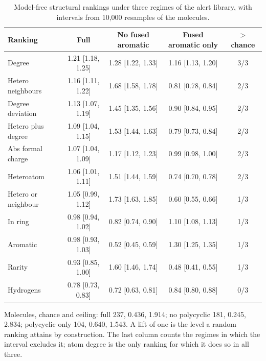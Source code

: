\begin{table}[htbp]
\centering
\caption{Model-free structural rankings under three regimes of the alert library, with intervals from 10,000 resamples of the molecules.}
\label{tab:regimes}
\small
\setlength{\tabcolsep}{4pt}
\begin{tabular}{lcccc}
\toprule
Ranking & Full & No fused aromatic & Fused aromatic only & $>$ chance \\
\midrule
Degree & 1.21 [1.18, 1.25] & 1.28 [1.22, 1.33] & 1.16 [1.13, 1.20] & 3/3 \\
Hetero neighbours & 1.16 [1.11, 1.22] & 1.68 [1.58, 1.78] & 0.81 [0.78, 0.84] & 2/3 \\
Degree deviation & 1.13 [1.07, 1.19] & 1.45 [1.35, 1.56] & 0.90 [0.84, 0.95] & 2/3 \\
Hetero plus degree & 1.09 [1.04, 1.15] & 1.53 [1.44, 1.63] & 0.79 [0.73, 0.84] & 2/3 \\
Abs formal charge & 1.07 [1.04, 1.09] & 1.17 [1.12, 1.23] & 0.99 [0.98, 1.00] & 2/3 \\
Heteroatom & 1.06 [1.01, 1.11] & 1.51 [1.44, 1.59] & 0.74 [0.70, 0.78] & 2/3 \\
Hetero or neighbour & 1.05 [0.99, 1.12] & 1.73 [1.63, 1.85] & 0.60 [0.55, 0.66] & 1/3 \\
In ring & 0.98 [0.94, 1.02] & 0.82 [0.74, 0.90] & 1.10 [1.08, 1.13] & 1/3 \\
Aromatic & 0.98 [0.93, 1.03] & 0.52 [0.45, 0.59] & 1.30 [1.25, 1.35] & 1/3 \\
Rarity & 0.93 [0.85, 1.00] & 1.60 [1.46, 1.74] & 0.48 [0.41, 0.55] & 1/3 \\
Hydrogens & 0.78 [0.73, 0.83] & 0.72 [0.63, 0.81] & 0.84 [0.80, 0.88] & 0/3 \\
\bottomrule
\end{tabular}
\begin{flushleft}\footnotesize Molecules, chance and ceiling: full 237, 0.436, 1.914; no polycyclic 181, 0.245, 2.834; polycyclic only 104, 0.640, 1.543. A lift of one is the level a random ranking attains by construction. The last column counts the regimes in which the interval excludes it; atom degree is the only ranking for which it does so in all three.\end{flushleft}
\end{table}
